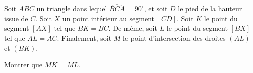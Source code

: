 Soit $ABC$ un triangle dans lequel $\widehat{BCA} = 90^\circ$, et soit $D$ le pied de la hauteur issue de
$C$. Soit $X$ un point intérieur au segment $[CD]$. Soit $K$ le point du segment $[AX]$ tel que $BK = BC$. De
même, soit $L$ le point du segment $[BX]$ tel que $AL = AC$. Finalement, soit $M$ le point d'intersection des
droites $(AL)$ et $(BK)$.

Montrer que $MK = ML$.
